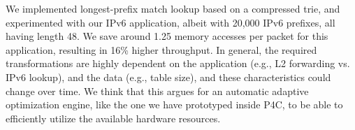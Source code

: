 We implemented longest-prefix match lookup based on a compressed trie, and
experimented with our IPv6 application, albeit with
20,000 IPv6 prefixes, all having length 48.
We save around 1.25 memory accesses per packet for this application, resulting in 16\%
higher throughput. In general, the required transformations are highly dependent
on the application (e.g., L2 forwarding vs. IPv6 lookup), and the data (e.g.,
table size), and these characteristics could change over time.
We think that this argues for an automatic adaptive optimization engine, like the one
we have prototyped inside P4C, to be able to efficiently utilize the available hardware
resources.

%
%
%
